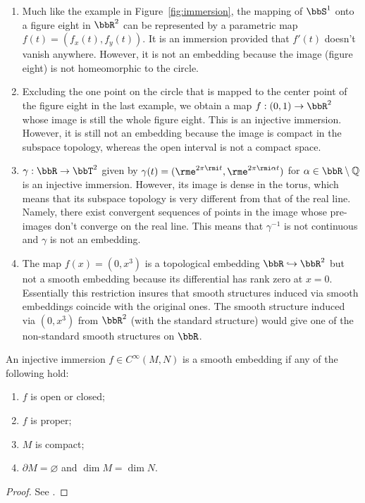 \begin{example}
\begin{enumerate}
    \item Much like the example in Figure~\ref{fig:immersion}, the mapping of $\bbS^1$ onto a figure eight in $\bbR^2$ can be represented by a parametric map $f(t)=(f_x(t),f_y(t))$. It is an immersion provided that $f'(t)$ doesn't vanish anywhere. However, it is not an embedding because the image (figure eight) is not homeomorphic to the circle.
    \item Excluding the one point on the circle that is mapped to the center point of the figure eight in the last example, we obtain a map $f:(0,1)\to \bbR^2$ whose image is still the whole figure eight. This is an injective immersion. However, it is still not an embedding because the image is compact in the subspace topology, whereas the open interval is not a compact space.
    \item $\gamma:\bbR \to \bbT^2$ given by $\gamma(t)=(\rme^{2\pi\rmi t},\rme^{2\pi\rmi \alpha t})$ for $\alpha\in\bbR \setminus\mathbb{Q}$ is an injective immersion. However, its image is dense in the torus, which means that its subspace topology is very different from that of the real line. Namely, there exist convergent sequences of points in the image whose pre-images don't converge on the real line. This means that $\gamma^{-1}$ is not continuous and $\gamma$ is not an embedding.
    \item The map $f(x)=(0,x^3)$ is a topological embedding $\bbR \hookrightarrow\bbR^2$ but not a smooth embedding because its differential has rank zero at $x=0$. Essentially this restriction insures that smooth structures induced via smooth embeddings coincide with the original ones. The smooth structure induced via $(0,x^3)$ from $\bbR^2$ (with the standard structure) would give one of the non-standard smooth structures on $\bbR $.
\end{enumerate}
\end{example}

\begin{prop}
An injective immersion $f\in C^\infty (M,N)$ is a smooth embedding if any of the following hold:
\begin{enumerate}
    \item $f$ is open or closed;
    \item $f$ is proper;
    \item $M$ is compact;
    \item $\partial M=\varnothing$ and $\dim M=\dim N$.
\end{enumerate}
\end{prop}
\begin{proof}
See \cite[Prop 4.22]{Lee}.
\end{proof}

